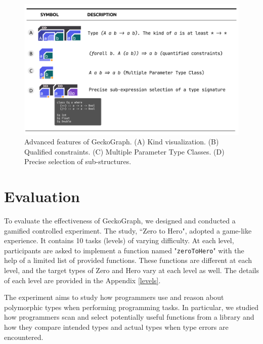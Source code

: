 \documentclass[preprint,12pt]{elsarticle}
\begin{document}
\begin{figure}[h]
  \includegraphics[width=\linewidth]{figures/Advanced}
  \caption{\label{fig:advanced}
  Advanced features of GeckoGraph. (A) Kind visualization. (B)  Qualified constraints. (C)  Multiple Parameter Type Classes. (D) Precise selection of sub-structures. }
\end{figure}


\section{Evaluation} \label{sec:evaluation}
To evaluate the effectiveness of GeckoGraph, we designed and conducted a gamified controlled experiment. The study, ``Zero to Hero", adopted a game-like experience. It contains 10 tasks (levels) of varying difficulty. At each level, participants are asked to implement a function named "\texttt{zeroToHero}" with the help of a limited list of provided functions. These functions are different at each level, and the target types of Zero and Hero vary at each level as well. The details of each level are provided in the Appendix \ref{levels}. 

The experiment aims to study how programmers use and reason about polymorphic types when performing programming tasks. In particular, we studied how programmers scan and select potentially useful functions from a library and how they compare intended types and actual types when type errors are encountered.
\end{document}
